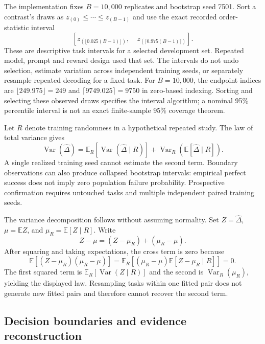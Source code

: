 \documentclass[11pt]{article}
\newcommand{\E}{\mathbb{E}}
\newcommand{\Var}{\operatorname{Var}}
\begin{document}
The implementation fixes $B=10{,}000$ replicates and bootstrap seed 7501. Sort a contrast's draws as $z_{(0)}\leq\cdots\leq z_{(B-1)}$ and use the exact recorded order-statistic interval
\begin{equation}
 \left[z_{(\lfloor0.025(B-1)\rfloor)},\quad
       z_{(\lceil0.975(B-1)\rceil)}\right].\label{eq:bootstrapinterval}
\end{equation}
These are descriptive task intervals for a selected development set. Repeated model, prompt and reward design used that set. The intervals do not undo selection, estimate variation across independent training seeds, or separately resample repeated decoding for a fixed task.
For $B=10{,}000$, the endpoint indices are $\lfloor249.975\rfloor=249$ and $\lceil9749.025\rceil=9750$ in zero-based indexing. Sorting and selecting these observed draws specifies the interval algorithm; a nominal 95\% percentile interval is not an exact finite-sample 95\% coverage theorem.

Let $R$ denote training randomness in a hypothetical repeated study. The law of total variance gives
\begin{equation}
 \Var(\widehat\Delta)=\E_R[\Var(\widehat\Delta\mid R)]
                       +\Var_R(\E[\widehat\Delta\mid R]).
\end{equation}
A single realized training seed cannot estimate the second term. Boundary observations can also produce collapsed bootstrap intervals: empirical perfect success does not imply zero population failure probability. Prospective confirmation requires untouched tasks and multiple independent paired training seeds.

The variance decomposition follows without assuming normality. Set $Z=\widehat\Delta$, $\mu=\E Z$, and $\mu_R=\E[Z\mid R]$. Write
\begin{equation}
 Z-\mu=(Z-\mu_R)+(\mu_R-\mu).
\end{equation}
After squaring and taking expectations, the cross term is zero because
\begin{equation}
 \E[(Z-\mu_R)(\mu_R-\mu)]
 =\E_R[(\mu_R-\mu)\E[Z-\mu_R\mid R]]=0.
\end{equation}
The first squared term is $\E_R[\Var(Z\mid R)]$ and the second is $\Var_R(\mu_R)$, yielding the displayed law. Resampling tasks within one fitted pair does not generate new fitted pairs and therefore cannot recover the second term.

\subsection{Decision boundaries and evidence reconstruction}
\end{document}
